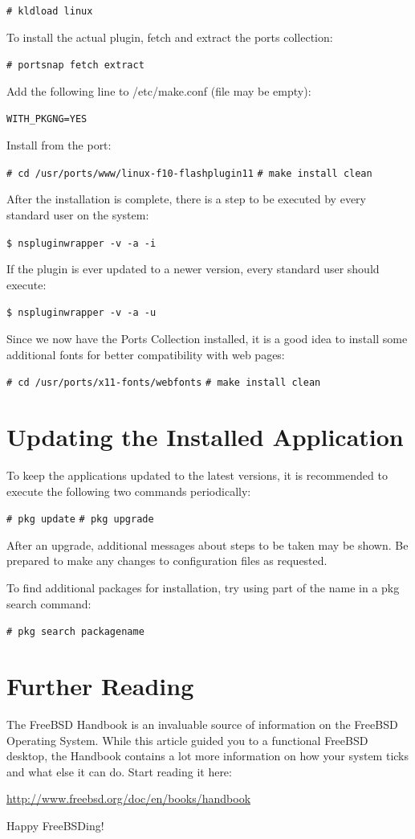 \documentclass[a4paper,twoside,12pt]{article}
\newcommand{\coderoot}[1]{\texttt{\# #1}}
\newcommand{\codeuser}[1]{\texttt{\$ #1}}
\begin{document}
\coderoot{kldload linux}

To install the actual plugin, fetch and extract the ports collection:

\coderoot{portsnap fetch extract}

Add the following line to /etc/make.conf (file may be empty):

\begin{verbatim}
WITH_PKGNG=YES
\end{verbatim}

Install from the port:

\coderoot{cd /usr/ports/www/linux-f10-flashplugin11}
\coderoot{make install clean}

After the installation is complete, there is a step to be executed by every standard user on the system:

\codeuser{nspluginwrapper -v -a -i}

If the plugin is ever updated to a newer version, every standard user should execute:

\codeuser{nspluginwrapper -v -a -u}

Since we now have the Ports Collection installed, it is a good idea to install some additional fonts for better compatibility with web pages:

\coderoot{cd /usr/ports/x11-fonts/webfonts}
\coderoot{make install clean}

\section{Updating the Installed Application}
To keep the applications updated to the latest versions, it is recommended to execute the following two commands periodically:

\coderoot{pkg update}
\coderoot{pkg upgrade}

After an upgrade, additional messages about steps to be taken may be shown. Be prepared to make any changes to configuration files as requested.

To find additional packages for installation, try using part of the name in a pkg search command:

\coderoot{pkg search packagename}

\section{Further Reading}
The FreeBSD Handbook is an invaluable source of information on the FreeBSD Operating System. While this article guided you to a functional FreeBSD desktop, the Handbook contains a lot more information on how your system ticks and what else it can do. Start reading it here:

\url{http://www.freebsd.org/doc/en/books/handbook}

Happy FreeBSDing!
\end{document}
